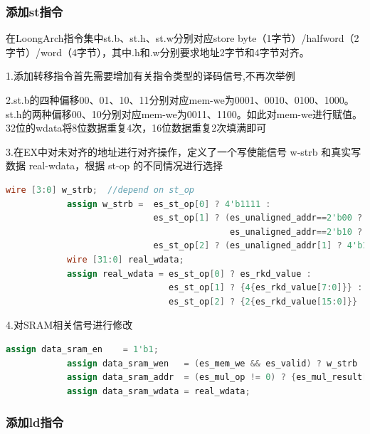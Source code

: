 \documentclass[12pt,a4paper]{article}
\begin{document}
        \subsubsection{添加st指令}
        在LoongArch指令集中st.b、st.h、st.w分别对应store byte（1字节）/halfword（2字节）/word（4字节），其中.h和.w分别要求地址2字节和4字节对齐。
        \par
        1.添加转移指令首先需要增加有关指令类型的译码信号,不再次举例
        \par
        2.st.b的四种偏移00、01、10、11分别对应mem-we为0001、0010、0100、1000。st.h的两种偏移00、10分别对应mem-we为0011、1100。如此对mem-we进行赋值。32位的wdata将8位数据重复4次，16位数据重复2次填满即可
        \par
        3.在EX中对未对齐的地址进行对齐操作，定义了一个写使能信号 w-strb 和真实写数据 real-wdata，根据 st-op 的不同情况进行选择
        \begin{lstlisting}[language=Verilog]
            wire [3:0] w_strb;  //depend on st_op
            assign w_strb =  es_st_op[0] ? 4'b1111 :
                             es_st_op[1] ? (es_unaligned_addr==2'b00 ? 4'b0001 : es_unaligned_addr==2'b01 ? 4'b0010 : 
                                            es_unaligned_addr==2'b10 ? 4'b0100 : 4'b1000) : 
                             es_st_op[2] ? (es_unaligned_addr[1] ? 4'b1100 : 4'b0011) : 4'b0000;
            wire [31:0] real_wdata;
            assign real_wdata = es_st_op[0] ? es_rkd_value :
                                es_st_op[1] ? {4{es_rkd_value[7:0]}} :
                                es_st_op[2] ? {2{es_rkd_value[15:0]}} : 32'b0;
        \end{lstlisting}\par
        4.对SRAM相关信号进行修改
        \begin{lstlisting}[language=Verilog]
            assign data_sram_en    = 1'b1;   
            assign data_sram_wen   = (es_mem_we && es_valid) ? w_strb : 4'b0000;
            assign data_sram_addr  = (es_mul_op != 0) ? {es_mul_result[31:2],2'b00} : {es_alu_result[31:2],2'b00};
            assign data_sram_wdata = real_wdata;   
        \end{lstlisting}

        \subsubsection{添加ld指令}
        
\end{document}

